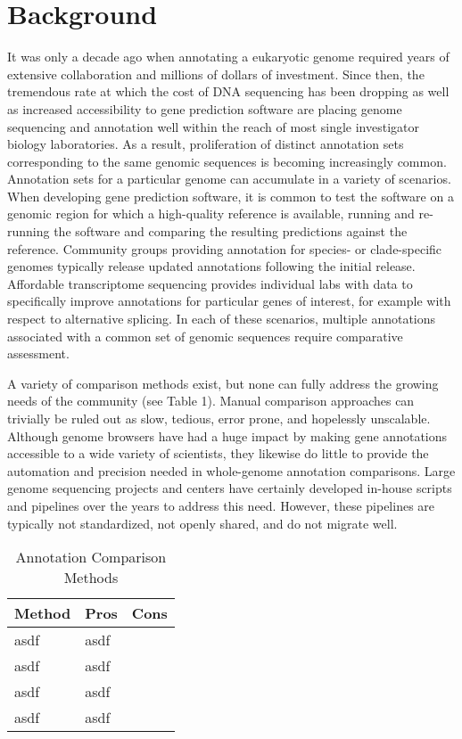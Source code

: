 \section{Background}
It was only a decade ago when annotating a eukaryotic genome required years of extensive collaboration and millions of dollars of investment.
Since then, the tremendous rate at which the cost of DNA sequencing has been dropping as well as increased accessibility to gene prediction software are placing genome sequencing and annotation well within the reach of most single investigator biology laboratories.
As a result, proliferation of distinct annotation sets corresponding to the same genomic sequences is becoming increasingly common.
Annotation sets for a particular genome can accumulate in a variety of scenarios.
When developing gene prediction software, it is common to test the software on a genomic region for which a high-quality reference is available, running and re-running the software and comparing the resulting predictions against the reference.
Community groups providing annotation for species- or clade-specific genomes typically release updated annotations following the initial release.
Affordable transcriptome sequencing provides individual labs with data to specifically improve annotations for particular genes of interest, for example with respect to alternative splicing.
In each of these scenarios, multiple annotations associated with a common set of genomic sequences require comparative assessment.

A variety of comparison methods exist, but none can fully address the growing needs of the community (see Table 1).
Manual comparison approaches can trivially be ruled out as slow, tedious, error prone, and hopelessly unscalable.
Although genome browsers have had a huge impact by making gene annotations accessible to a wide variety of scientists, they likewise do little to provide the automation and precision needed in whole-genome annotation comparisons.
Large genome sequencing projects and centers have certainly developed in-house scripts and pipelines over the years to address this need.
However, these pipelines are typically not standardized, not openly shared, and do not migrate well.

\begin{table}
\caption{Annotation Comparison Methods}
\label{Table:AnnotationComparisonMethods}
\begin{tabular}{lll}
\hline
Method   & Pros        & Cons         \\ \hline
asdf     & asdf        &              \\
asdf     & asdf        &              \\
asdf     & asdf        &              \\
asdf     & asdf        &              \\ \hline
\end{tabular}
\end{table}

